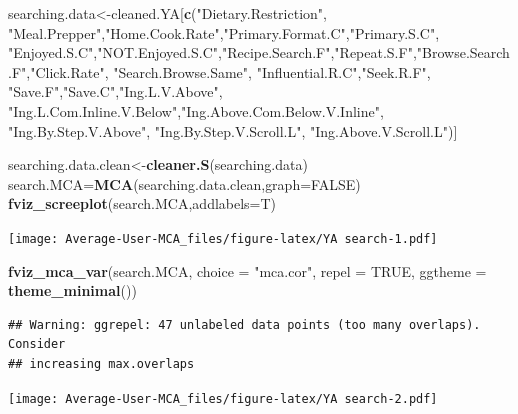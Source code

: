 \documentclass[
]{article}
\newenvironment{Shaded}{\begin{snugshade}}{\end{snugshade}}
\newcommand{\DataTypeTok}[1]{\textcolor[rgb]{0.13,0.29,0.53}{#1}}
\newcommand{\KeywordTok}[1]{\textcolor[rgb]{0.13,0.29,0.53}{\textbf{#1}}}
\newcommand{\NormalTok}[1]{#1}
\newcommand{\OtherTok}[1]{\textcolor[rgb]{0.56,0.35,0.01}{#1}}
\newcommand{\StringTok}[1]{\textcolor[rgb]{0.31,0.60,0.02}{#1}}
\begin{document}
\begin{Shaded}
\begin{Highlighting}[]
\NormalTok{searching.data<-cleaned.YA[}\KeywordTok{c}\NormalTok{(}\StringTok{"Dietary.Restriction"}\NormalTok{, }\StringTok{"Meal.Prepper"}\NormalTok{,}\StringTok{"Home.Cook.Rate"}\NormalTok{,}\StringTok{"Primary.Format.C"}\NormalTok{,}\StringTok{"Primary.S.C"}\NormalTok{,}
            \StringTok{"Enjoyed.S.C"}\NormalTok{,}\StringTok{"NOT.Enjoyed.S.C"}\NormalTok{,}\StringTok{"Recipe.Search.F"}\NormalTok{,}\StringTok{"Repeat.S.F"}\NormalTok{,}\StringTok{"Browse.Search.F"}\NormalTok{,}\StringTok{"Click.Rate"}\NormalTok{,}
            \StringTok{"Search.Browse.Same"}\NormalTok{, }\StringTok{"Influential.R.C"}\NormalTok{,}\StringTok{"Seek.R.F"}\NormalTok{, }\StringTok{"Save.F"}\NormalTok{,}\StringTok{"Save.C"}\NormalTok{,}\StringTok{"Ing.L.V.Above"}\NormalTok{,}
            \StringTok{"Ing.L.Com.Inline.V.Below"}\NormalTok{,}\StringTok{"Ing.Above.Com.Below.V.Inline"}\NormalTok{,  }\StringTok{"Ing.By.Step.V.Above"}\NormalTok{,  }\StringTok{"Ing.By.Step.V.Scroll.L"}\NormalTok{,}
            \StringTok{"Ing.Above.V.Scroll.L"}\NormalTok{)]}

\NormalTok{searching.data.clean<-}\KeywordTok{cleaner.S}\NormalTok{(searching.data)}
\NormalTok{search.MCA=}\KeywordTok{MCA}\NormalTok{(searching.data.clean,}\DataTypeTok{graph=}\OtherTok{FALSE}\NormalTok{)}
\KeywordTok{fviz_screeplot}\NormalTok{(search.MCA,}\DataTypeTok{addlabels=}\NormalTok{T)}
\end{Highlighting}
\end{Shaded}

\texttt{[image: Average-User-MCA\_files/figure-latex/YA search-1.pdf]}

\begin{Shaded}
\begin{Highlighting}[]
\KeywordTok{fviz_mca_var}\NormalTok{(search.MCA, }\DataTypeTok{choice =} \StringTok{"mca.cor"}\NormalTok{, }\DataTypeTok{repel =} \OtherTok{TRUE}\NormalTok{,}
             \DataTypeTok{ggtheme =} \KeywordTok{theme_minimal}\NormalTok{())}
\end{Highlighting}
\end{Shaded}

\begin{verbatim}
## Warning: ggrepel: 47 unlabeled data points (too many overlaps). Consider
## increasing max.overlaps
\end{verbatim}

\texttt{[image: Average-User-MCA\_files/figure-latex/YA search-2.pdf]}
\end{document}
